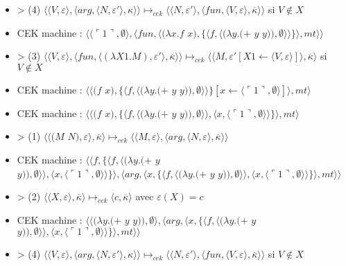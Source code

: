 \documentclass[10pt,a4paper]{report}
\begin{document}
\begin{itemize}
\item[] > (4) $\langle \langle V,\varepsilon\rangle,\langle arg,\langle N,\varepsilon'\rangle,\kappa\rangle\rangle \longmapsto_{cek} \langle \langle N,\varepsilon'\rangle,\langle fun,\langle V,\varepsilon\rangle,\overline{\kappa}\rangle\rangle$ si $V \notin X$
\item[] CEK machine : $\langle\langle\ulcorner 1\urcorner,\emptyset\rangle,\langle fun,\langle(\lambda x.f$ $x),\{\langle f,\langle(\lambda y.(+$ $y$ $y)),\emptyset\rangle\rangle\}\rangle,mt\rangle\rangle$
\item[] > (3) $\langle\langle V,\varepsilon\rangle,\langle fun,\langle (\lambda X1.M),\varepsilon'\rangle,\overline{\kappa} \rangle \rangle \longmapsto_{cek} \langle \langle M,\varepsilon'[X1 \leftarrow \langle V,\varepsilon\rangle]\rangle,\overline{\kappa}\rangle$ si $V \notin X$
\item[] CEK machine : $\langle\langle(f$ $x),\{\langle f,\langle(\lambda y.(+$ $y$ $y)),\emptyset\rangle\rangle\}[x \leftarrow \langle\ulcorner 1\urcorner,\emptyset\rangle]\rangle,mt\rangle$
\item[] CEK machine : $\langle\langle(f$ $x),\{\langle f,\langle(\lambda y.(+$ $y$ $y)),\emptyset\rangle\rangle,\langle x,\langle\ulcorner 1\urcorner,\emptyset\rangle\rangle\}\rangle,mt\rangle$
\item[] > (1) $\langle\langle(M$ $N),\varepsilon\rangle,\overline{\kappa}\rangle \longmapsto_{cek} \langle \langle M,\varepsilon\rangle,\langle arg,\langle N,\varepsilon\rangle,\overline{\kappa}\rangle\rangle$
\item[] CEK machine : $\langle\langle f,\{\langle f,\langle(\lambda y.(+$ $y$ $y)),\emptyset\rangle\rangle,\langle x,\langle\ulcorner 1\urcorner,\emptyset\rangle\rangle\}\rangle,\langle arg,\langle x,\{\langle f,\langle(\lambda y.(+$ $y$ $y)),\emptyset\rangle\rangle,\langle x,\langle\ulcorner 1\urcorner,\emptyset\rangle\rangle\}\rangle,mt\rangle\rangle$
\item[] > (2) $\langle\langle X,\varepsilon\rangle,\overline{\kappa}\rangle \longmapsto_{cek} \langle c,\overline{\kappa}\rangle$ avec $\varepsilon(X) = c$
\item[] CEK machine : $\langle\langle(\lambda y.(+$ $y$ $y)),\emptyset\rangle,\langle arg,\langle x,\{\langle f,\langle(\lambda y.(+$ $y$ $y)),\emptyset\rangle\rangle,\langle x,\langle\ulcorner 1\urcorner,\emptyset\rangle\rangle\}\rangle,mt\rangle\rangle$
\item[] > (4) $\langle \langle V,\varepsilon\rangle,\langle arg,\langle N,\varepsilon'\rangle,\kappa\rangle\rangle \longmapsto_{cek} \langle \langle N,\varepsilon'\rangle,\langle fun,\langle V,\varepsilon\rangle,\overline{\kappa}\rangle\rangle$ si $V \notin X$

\end{itemize}
\end{document}
